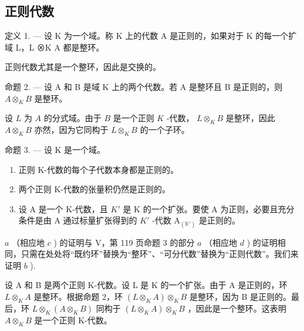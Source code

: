 \subsection{正则代数}

定义 1. --- 设 K 为一个域。称 K 上的代数 A 是正则的，如果对于 K 的每一个扩域 L，L ⊗K A 都是整环。

正则代数尤其是一个整环，因此是交换的。

命题 2. --- 设 A 和 B 是域 K 上的两个代数。若 A 是整环且 B 是正则的，则 \(A \otimes_{K} B\) 是整环。

设 \(L\) 为 \(A\) 的分式域。由于 \(B\) 是一个正则 \(K\) -代数， \(L \otimes_K B\) 是整环，因此 \(A \otimes_K B\) 亦然，因为它同构于 \(L \otimes_K B\) 的一个子环。

命题 3. --- 设 K 是一个域。

\begin{enumerate}
\def\labelenumi{\alph{enumi})}
\item
  正则 K-代数的每个子代数本身都是正则的。
\item
  两个正则 K-代数的张量积仍然是正则的。
\item
  设 A 是一个 K-代数，且 \(K'\) 是 K 的一个扩张。要使 A 为正则，必要且充分条件是由 A 通过标量扩张得到的 \(K'\) -代数 \(\mathrm{A}_{(\mathbb{K}')}\) 是正则的。
\end{enumerate}

\(a\) （相应地 \(c\) ) 的证明与 V，第 119 页命题 3 的部分 \(a\) （相应地 \(d\) ) 的证明相同，只需在处处将“既约环”替换为“整环”、“可分代数”替换为“正则代数”。我们来证明 \(b\) ).

设 A 和 B 是两个正则 K-代数。设 L 是 K 的一个扩张。由于 A 是正则的，环 \(L \otimes_{K} A\) 是整环。根据命题 2，环 \((L \otimes_{K} A) \otimes_{K} B\) 是整环，因为 B 是正则的。最后，环 \(L \otimes_{K} (A \otimes_{K} B)\) 同构于 \((L \otimes_{K} A) \otimes_{K} B\) ，因此是一个整环。这表明 \(A \otimes_{K} B\) 是一个正则 K-代数。

